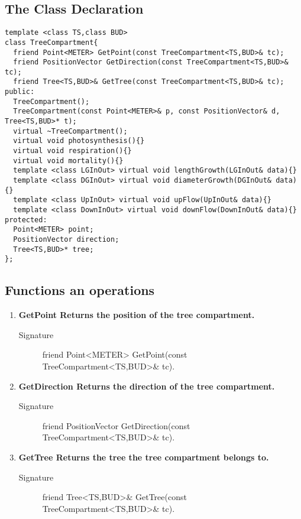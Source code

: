 \subsection{The Class Declaration}
\begin{verbatim}
template <class TS,class BUD> 
class TreeCompartment{
  friend Point<METER> GetPoint(const TreeCompartment<TS,BUD>& tc);
  friend PositionVector GetDirection(const TreeCompartment<TS,BUD>&
tc);
  friend Tree<TS,BUD>& GetTree(const TreeCompartment<TS,BUD>& tc);
public:
  TreeCompartment();
  TreeCompartment(const Point<METER>& p, const PositionVector& d, Tree<TS,BUD>* t);
  virtual ~TreeCompartment();
  virtual void photosynthesis(){}
  virtual void respiration(){}
  virtual void mortality(){}
  template <class LGInOut> virtual void lengthGrowth(LGInOut& data){}
  template <class DGInOut> virtual void diameterGrowth(DGInOut& data){}
  template <class UpInOut> virtual void upFlow(UpInOut& data){}
  template <class DownInOut> virtual void downFlow(DownInOut& data){}
protected:
  Point<METER> point;
  PositionVector direction;
  Tree<TS,BUD>* tree;
};
\end{verbatim}

\subsection{Functions an operations}
\begin{enumerate}
\item \bf GetPoint \rm Returns the position of the tree compartment.
\begin{description}
    \item [Signature] friend Point<METER> GetPoint(const
    TreeCompartment<TS,BUD>\& tc).
\end{description}
\item \bf GetDirection \rm Returns the direction of the tree compartment.
\begin{description}
    \item [Signature] friend PositionVector GetDirection(const TreeCompartment<TS,BUD>\& tc).
\end{description}
\item \bf GetTree \rm Returns the tree the tree compartment
belongs to.
\begin{description}
    \item [Signature] friend Tree<TS,BUD>\& GetTree(const TreeCompartment<TS,BUD>\& tc).
\end{description}
\end{enumerate}


